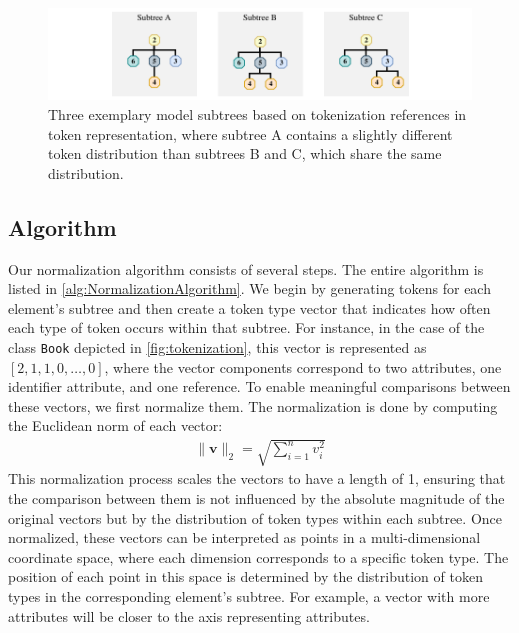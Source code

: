 \begin{figure}
    \centering
    \includegraphics[width=\linewidth]{figures/mde/subtree-examples.pdf}
    \caption[Model Subtree Examples]{Three exemplary model subtrees based on tokenization references in token representation, where subtree A contains a slightly different token distribution than subtrees B and C, which share the same distribution.}
    \label{fig:tree-examples}
\end{figure}


\subsection{Algorithm}
Our normalization algorithm consists of several steps. The entire algorithm is listed in \autoref{alg:NormalizationAlgorithm}.
We begin by generating tokens for each element's subtree and then create a token type vector that indicates how often each type of token occurs within that subtree. For instance, in the case of the class \texttt{Book} depicted in \autoref{fig:tokenization}, this vector is represented as $[2, 1, 1, 0, \dots, 0]$, where the vector components correspond to two attributes, one identifier attribute, and one reference.
To enable meaningful comparisons between these vectors, we first normalize them. The normalization is done by computing the Euclidean norm of each vector:
\begin{align*}
    \|\mathbf{v}\|_2 = \sqrt{\sum_{i=1}^{n}v_i^2}
\end{align*}
This normalization process scales the vectors to have a length of 1, ensuring that the comparison between them is not influenced by the absolute magnitude of the original vectors but by the distribution of token types within each subtree.
Once normalized, these vectors can be interpreted as points in a multi-dimensional coordinate space, where each dimension corresponds to a specific token type. The position of each point in this space is determined by the distribution of token types in the corresponding element's subtree. For example, a vector with more attributes will be closer to the axis representing attributes.

